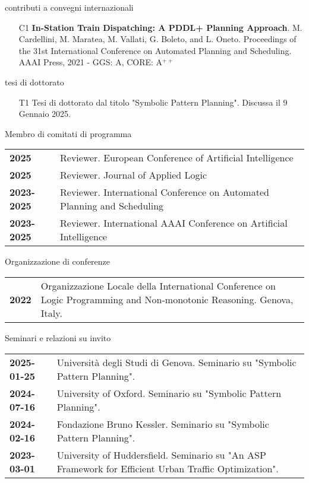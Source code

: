 \documentclass{resume} %
\begin{document}
\begin{rSection}{contributi a convegni internazionali}
\begin{enumerate}[leftmargin=5mm]
	\item[C1] \textbf{In-Station Train Dispatching: A PDDL+ Planning Approach}. M. Cardellini, M. Maratea, M. Vallati, G. Boleto, and L. Oneto. Proceedings of the 31st International Conference on Automated Planning and Scheduling. AAAI Press, 2021 - GGS: A, CORE: A$^{++}$
\end{enumerate}
\end{rSection}

 \begin{rSection}{tesi di dottorato}
  \begin{enumerate}[leftmargin=5mm]
	\item[T1] Tesi di dottorato dal titolo "Symbolic Pattern Planning". Discussa il 9 Gennaio 2025.	
	\end{enumerate}
 \end{rSection}
 
 
  \begin{rSection}{Membro di comitati di programma}
	\begin{tabularx}{0.95\textwidth} {lp{14cm}}
 \textbf{2025} & Reviewer. European Conference of Artificial Intelligence \\
 \textbf{2025} & Reviewer. Journal of Applied Logic \\
 \textbf{2023-2025} & Reviewer. International Conference on Automated Planning and Scheduling \\
 \textbf{2023-2025} & Reviewer. International AAAI Conference on Artificial Intelligence 
  \end{tabularx}
 \end{rSection}
 
  \begin{rSection}{Organizzazione di conferenze}
	\begin{tabularx}{0.95\textwidth} {lp{14cm}}
 \textbf{2022} & Organizzazione Locale della International Conference on Logic Programming and Non-monotonic Reasoning. Genova, Italy.
  \end{tabularx}
 \end{rSection}


 \begin{rSection}{Seminari e relazioni su invito}
 	\begin{tabularx}{0.95\textwidth} {lp{14cm}}
 \textbf{2025-01-25} & Università degli Studi di Genova. Seminario su "Symbolic Pattern Planning".\\
 \textbf{2024-07-16} & University of Oxford. Seminario su "Symbolic Pattern Planning".\\
 \textbf{2024-02-16} & Fondazione Bruno Kessler. Seminario su "Symbolic Pattern Planning".\\
 \textbf{2023-03-01} & University of Huddersfield. Seminario su "An ASP Framework for Efficient Urban Traffic Optimization".\\
 \end{tabularx}

\end{rSection}
\end{document}
